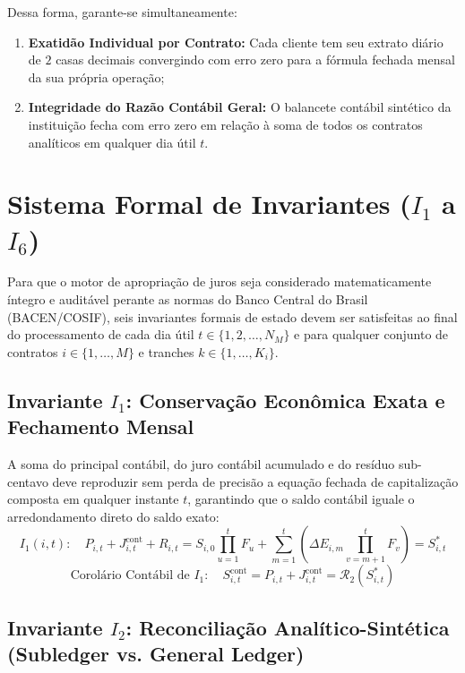 \documentclass[11pt, a4paper]{article}
\begin{document}
Dessa forma, garante-se simultaneamente:
\begin{enumerate}
    \item \textbf{Exatidão Individual por Contrato:} Cada cliente tem seu extrato diário de $2$ casas decimais convergindo com erro zero para a fórmula fechada mensal da sua própria operação;
    \item \textbf{Integridade do Razão Contábil Geral:} O balancete contábil sintético da instituição fecha com erro zero em relação à soma de todos os contratos analíticos em qualquer dia útil $t$.
\end{enumerate}

\section{Sistema Formal de Invariantes ($I_1$ a $I_6$)}

Para que o motor de apropriação de juros seja considerado matematicamente íntegro e auditável perante as normas do Banco Central do Brasil (BACEN/COSIF), seis invariantes formais de estado devem ser satisfeitas ao final do processamento de cada dia útil $t \in \{1, 2, \dots, N_M\}$ e para qualquer conjunto de contratos $i \in \{1, \dots, M\}$ e tranches $k \in \{1, \dots, K_i\}$.

\subsection{Invariante $I_1$: Conservação Econômica Exata e Fechamento Mensal}

A soma do principal contábil, do juro contábil acumulado e do resíduo sub-centavo deve reproduzir sem perda de precisão a equação fechada de capitalização composta em qualquer instante $t$, garantindo que o saldo contábil iguale o arredondamento direto do saldo exato:
\begin{equation}
    I_1(i, t): \quad P_{i,t} + J_{i,t}^{\text{cont}} + R_{i,t} = S_{i,0} \prod_{u=1}^{t} F_u + \sum_{m=1}^{t} \left( \Delta E_{i,m} \prod_{v=m+1}^{t} F_v \right) = S_{i,t}^{*}
\end{equation}
\begin{equation}
    \text{Corolário Contábil de } I_1: \quad S_{i,t}^{\text{cont}} = P_{i,t} + J_{i,t}^{\text{cont}} = \mathcal{R}_2\left(S_{i,t}^{*}\right)
\end{equation}

\subsection{Invariante $I_2$: Reconciliação Analítico-Sintética (Subledger vs. General Ledger)}
\end{document}
